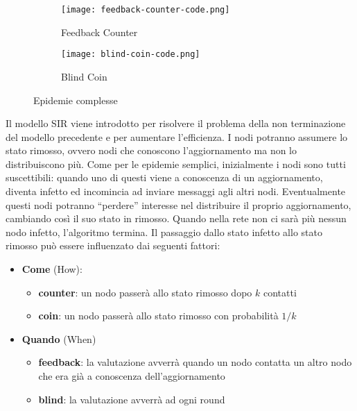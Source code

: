 \begin{figure}[!htb]
    \begin{subfigure}{0.40\textwidth}
      \texttt{[image: feedback-counter-code.png]}
      \caption{Feedback Counter}\label{fig:feedback_counter_code}
    \end{subfigure}\hfill
    \begin{subfigure}{0.40\textwidth}
      \texttt{[image: blind-coin-code.png]}
      \caption{Blind Coin}\label{fig:blind_coin_code}
    \end{subfigure}\hfill
    \caption{Epidemie complesse}
    \label{fig:simple_epidemics}
    \end{figure}
Il modello SIR viene introdotto per risolvere il problema della non terminazione del modello precedente e per aumentare l’efficienza. I nodi potranno assumere lo stato rimosso, ovvero nodi che conoscono l’aggiornamento ma non lo distribuiscono più.
Come per le epidemie semplici, inizialmente i nodi sono tutti suscettibili: quando uno di questi viene a conoscenza di un aggiornamento, diventa infetto ed incomincia ad inviare messaggi agli altri nodi. Eventualmente questi nodi potranno “perdere” interesse nel distribuire il proprio aggiornamento, cambiando così il suo stato in rimosso.
Quando nella rete non ci sarà più nessun nodo infetto, l’algoritmo termina.
Il passaggio dallo stato infetto allo stato rimosso può essere influenzato dai seguenti fattori:

\begin{itemize}
    \item \textbf{Come} (How):
    \begin{itemize}
        \item \textbf{counter}: un nodo passerà allo stato rimosso dopo $k$ contatti
        \item \textbf{coin}: un nodo passerà allo stato rimosso con probabilità $1/k$

    \end{itemize}
    \item \textbf{Quando} (When)
    \begin{itemize}
        \item \textbf{feedback}: la valutazione avverrà quando un nodo contatta un altro nodo che era già a conoscenza dell’aggiornamento
        \item \textbf{blind}: la valutazione avverrà ad ogni round
    \end{itemize}
\end{itemize}

